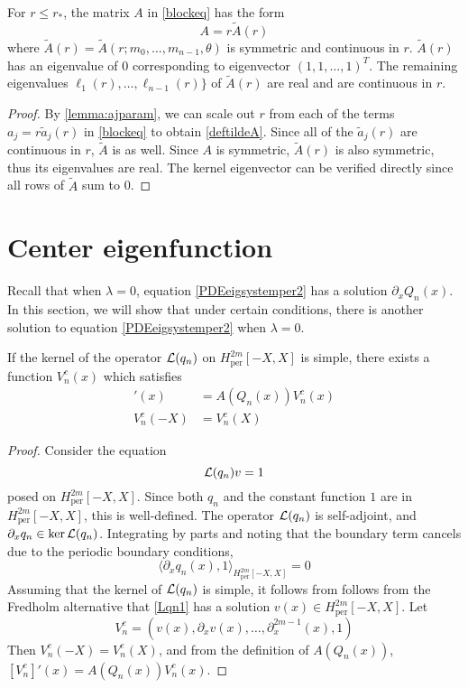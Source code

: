 \documentclass[thesis.tex]{subfiles}
\begin{document}
\begin{lemma}\label{lemma:tildeA}
For $r \leq r_*$, the matrix $A$ in \cref{blockeq} has the form
\begin{equation}\label{deftildeA}
A = r \tilde{A}(r)
\end{equation}
where $\tilde{A}(r) = \tilde{A}(r; m_0, \dots, m_{n-1}, \theta)$ is symmetric and continuous in $r$. $\tilde{A}(r)$ has an eigenvalue of 0 corresponding to eigenvector $(1, 1, \dots, 1)^T$. The remaining eigenvalues $\ell_1(r), \dots, \ell_{n-1}(r) \}$ of $\tilde{A}(r)$ are real and are continuous in $r$.
\begin{proof}
By \cref{lemma:ajparam}, we can scale out $r$ from each of the terms $a_j = r \tilde{a}_j(r)$ in \cref{blockeq} to obtain \cref{deftildeA}. Since all of the $\tilde{a}_j(r)$ are continuous in $r$, $\tilde{A}$ is as well. Since $A$ is symmetric, $\tilde{A}(r)$ is also symmetric, thus its eigenvalues are real. The kernel eigenvector can be verified directly since all rows of $\tilde{A}$ sum to 0.
\end{proof}
\end{lemma}

\section{Center eigenfunction}

Recall that when $\lambda = 0$, equation \cref{PDEeigsystemper2} has a solution $\partial_x Q_n(x)$. 
In this section, we will show that under certain conditions, there is another solution to equation \cref{PDEeigsystemper2} when $\lambda = 0$.

\begin{lemma}\label{lemma:centereigenfn1}
If the kernel of the operator $\mathcal{L}(q_n)$ on $H^{2m}_{\text{per}}[-X,X]$ is simple, there exists a function $V_n^c(x)$ which satisfies
\begin{align*}
[V_n^c]'(x) &= A(Q_n(x))V_n^c(x) \\
V_n^c(-X) &= V_n^c(X)
\end{align*}
\begin{proof}
Consider the equation
\begin{equation}\label{Lqn1}
\mathcal{L}(q_n) v = 1
\end{equation}
posed on $H^{2m}_{\text{per}}[-X,X]$. Since both $q_n$ and the constant function $1$ are in $H^{2m}_{\text{per}}[-X,X]$, this is well-defined. The operator $\mathcal{L}(q_n)$ is self-adjoint, and $\partial_x q_n \in \mathop\mathrm{ker}\nolimits \mathcal{L}(q_n)$. Integrating by parts and noting that the boundary term cancels due to the periodic boundary conditions,
\[
\langle \partial_x q_n(x), 1 \rangle_{H^{2m}_{\text{per}}[-X,X]} = 0
\]
Assuming that the kernel of $\mathcal{L}(q_n)$ is simple, it follows from follows from the Fredholm alternative that \cref{Lqn1} has a solution $v(x) \in {H^{2m}_{\text{per}}[-X,X]}$. Let
\[
V_n^c = \left( v(x), \partial_x v(x), \dots, \partial_x^{2m-1}(x), 1 \right)
\]
Then $V_n^c(-X) = V_n^c(X)$, and from the definition of $A(Q_n(x))$, $[V_n^c]'(x) = A(Q_n(x))V_n^c(x)$.
\end{proof}
\end{lemma}
\end{document}
